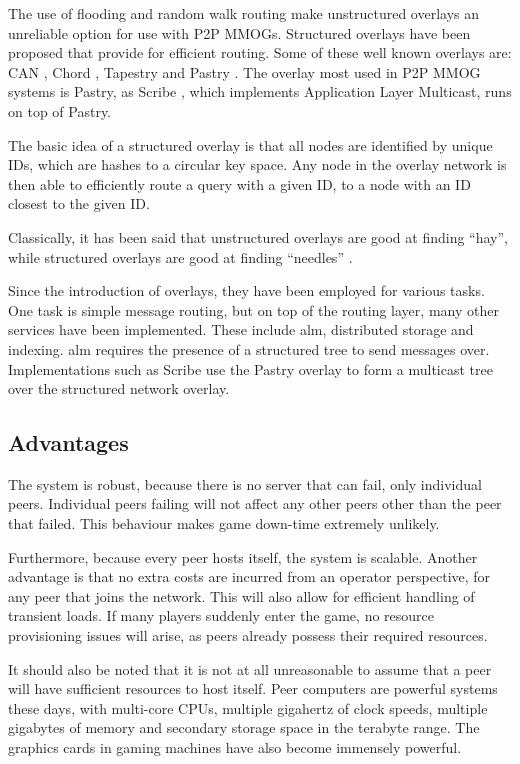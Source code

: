 \documentclass[10pt,a4paper,journal,cspaper,compsoc]{IEEEtran}
\begin{document}
The use of flooding and random walk routing make unstructured overlays an unreliable option for use with P2P MMOGs. Structured overlays have been
proposed that provide for efficient routing. Some of these well known overlays are: CAN \cite{CAN}, Chord \cite{chord}, Tapestry \cite{tapestry} and
Pastry \cite{pastry}. The overlay most used in P2P MMOG systems is Pastry, as Scribe \cite{scribe}, which implements Application Layer Multicast,
runs on top of Pastry.

The basic idea of a structured overlay is that all nodes are identified by unique IDs, which are hashes to a circular key space. Any node in the
overlay network is then able to efficiently route a query with a given ID, to a node with an ID closest to the given ID.

Classically, it has been said that unstructured overlays are good at finding ``hay'', while structured overlays are good at finding ``needles''
\cite{Rodrigues_acm_comms_p2p}.

Since the introduction of overlays, they have been employed for various tasks. One task is simple message routing, but on top of the routing layer,
many other services have been implemented. These include \ac{alm}, distributed storage \cite{past_storage_focus} and indexing. \ac{alm} requires the
presence of a structured tree to send messages over. Implementations such as Scribe use the Pastry overlay to form a multicast tree over the
structured network overlay.

\subsection{Advantages}

The system is robust, because there is no server that can fail, only individual peers. Individual peers failing will not affect any other peers other
than the peer that failed. This behaviour makes game down-time extremely unlikely.

Furthermore, because every peer hosts itself, the system is scalable. Another advantage is that no extra costs are incurred from an operator
perspective, for any peer that joins the network. This will also allow for efficient handling of transient loads. If many players suddenly enter the
game, no resource provisioning issues will arise, as peers already possess their required resources.

It should also be noted that it is not at all unreasonable to assume that a peer will have sufficient resources to host itself. Peer computers are
powerful systems these days, with multi-core CPUs, multiple gigahertz of clock speeds, multiple gigabytes of memory and secondary storage space in
the terabyte range. The graphics cards in gaming machines have also become immensely powerful.
\end{document}

